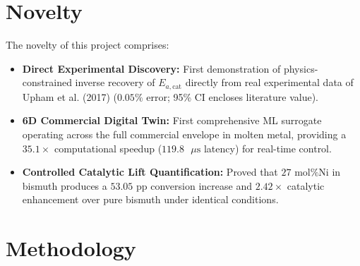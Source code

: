 \documentclass[12pt,a4paper,oneside]{report}
\begin{document}
\chapter{Novelty}
The novelty of this project comprises:
\begin{itemize}
    \item \textbf{Direct Experimental Discovery:} First demonstration of physics-constrained inverse recovery of $E_{a,\text{cat}}$ directly from real experimental data of Upham et al. (2017) ($0.05\%$ error; 95\% CI encloses literature value).
    \item \textbf{6D Commercial Digital Twin:} First comprehensive ML surrogate operating across the full commercial envelope in molten metal, providing a $35.1\times$ computational speedup ($119.8\text{ }\mu\text{s}$ latency) for real-time control.
    \item \textbf{Controlled Catalytic Lift Quantification:} Proved that $27\text{ mol\% Ni}$ in bismuth produces a $53.05\text{ pp}$ conversion increase and $2.42\times$ catalytic enhancement over pure bismuth under identical conditions.
\end{itemize}

\chapter{Methodology}
\end{document}
